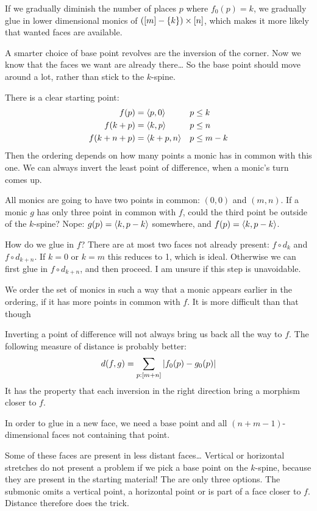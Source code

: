 \documentclass[csh.tex]{subfiles}
\begin{document}
If we gradually diminish the number of places $p$ where $f_0(p)=k$, we gradually glue in lower dimensional monics of $([m]-\left\{k\right\})\times [n]$, which makes it more likely that wanted faces are available.

A smarter choice of base point revolves are the inversion of the corner. Now we know that the faces we want are already there\dots
So the base point should move around a lot, rather than stick to the $k$-spine.

There is a clear starting point:
\begin{align*}
f(p) &= \left\langle p,0 \right\rangle & p&\leq k\\
f(k+p) &= \left\langle k,p \right\rangle & p&\leq n\\
f(k+n+p) &= \left\langle k+p,n \right\rangle & p&\leq m-k
\end{align*}
Then the ordering depends on how many points a monic has in common with this one. We can always invert the least point of difference, when a monic's turn comes up.

All monics are going to have two points in common: $(0,0)$ and $(m,n)$.
If a monic $g$ has only three point in common with $f$, could the third point be outside of the $k$-spine? 
Nope: $g(p)=\left\langle k,p-k \right\rangle$ somewhere, and $f(p)=\left\langle k,p-k \right\rangle$.

How do we glue in $f$?
There are at most two faces not already present: $f\circ d_k$ and $f\circ d_{k+n}$. If $k=0$ or $k=m$ this reduces to 1, which is ideal.
Otherwise we can first glue in $f\circ d_{k+n}$, and then proceed. I am unsure if this step is unavoidable.

We order the set of monics in such a way that a monic appears earlier in the ordering, if it has more points in common with $f$.
It is more difficult than that though

Inverting a point of difference will not always bring us back all the way to $f$. 
The following measure of distance is probably better:
\[ d(f,g) = \sum_{p\mathord :[m+n]}| f_0(p)-g_0(p) | \]
It has the property that each inversion in the right direction bring a morphism closer to $f$.

In order to glue in a new face, we need a base point and all $(n+m-1)$-dimensional faces not containing that point.

Some of these faces are present in less distant faces\dots
Vertical or horizontal stretches do not present a problem if we pick a base point on the $k$-spine, because they are present in the starting material!
The are only three options. The submonic omits a vertical point, a horizontal point or is part of a face closer to $f$. Distance therefore does the trick.
\end{document}
